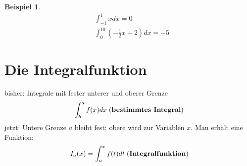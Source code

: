 \documentclass[a4paper,12pt,pointlessnumbers]{scrreprt}
\theoremstyle{definition}
\newtheorem{example}[definition]{Beispiel}
\begin{document}
\begin{example}
\begin{align}
&\int_{-1}^1 x dx = 0
\\ &\int_0^{10}(-\frac{1}{2}x+2) dx =-5
\end{align}
\end{example}

\section{Die Integralfunktion}
bisher: Integrale mit fester unterer und oberer Grenze
\begin{align*}
\int_b^a f(x) dx\;\text{(\textbf{bestimmtes Integral})}
\end{align*}
jetzt: Untere Grenze $a$ bleibt fest; obere wird zur Variablen $x$. Man erhält eine Funktion:
\begin{align*}
I_a (x)=\int_a^x f(t) dt \;\text{(\textbf{Integralfunktion})}
\end{align*}


\newpage
\end{document}

